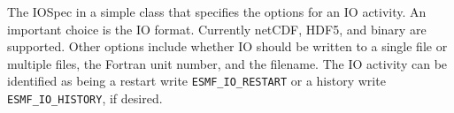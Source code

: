 
The IOSpec in a simple class that specifies the options for 
an IO activity.  An important choice is the IO format.  Currently
 netCDF, HDF5, and binary are supported.  Other options include 
whether IO should be written to a single file or multiple files, 
the Fortran unit number, and the filename.  The IO activity can
be identified as being a restart write {\tt ESMF\_IO\_RESTART} or 
a history write {\tt ESMF\_IO\_HISTORY}, if desired.



